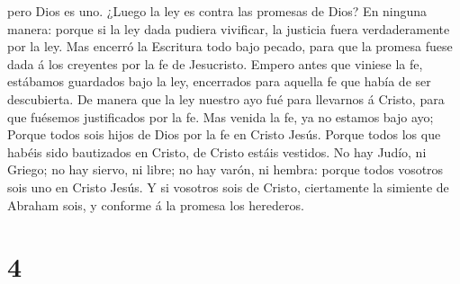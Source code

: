 pero Dios es uno.  ¿Luego la ley es contra las promesas de
Dios? En ninguna manera: porque si la ley dada pudiera vivificar, la
justicia fuera verdaderamente por la ley.  Mas encerró la
Escritura todo bajo pecado, para que la promesa fuese dada á los
creyentes por la fe de Jesucristo.  Empero antes que
viniese la fe, estábamos guardados bajo la ley, encerrados para aquella
fe que había de ser descubierta.  De manera que la ley
nuestro ayo fué para llevarnos á Cristo, para que fuésemos justificados
por la fe.  Mas venida la fe, ya no estamos bajo ayo;
 Porque todos sois hijos de Dios por la fe en Cristo Jesús.
 Porque todos los que habéis sido bautizados en Cristo, de
Cristo estáis vestidos.  No hay Judío, ni Griego; no hay
siervo, ni libre; no hay varón, ni hembra: porque todos vosotros sois
uno en Cristo Jesús.  Y si vosotros sois de Cristo,
ciertamente la simiente de Abraham sois, y conforme á la promesa los
herederos.

\hypertarget{section-3}{%
\section{4}\label{section-3}}

